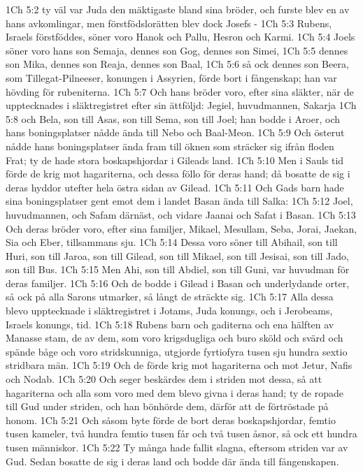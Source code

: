 1Ch 5:2  ty väl var Juda den mäktigaste bland sina bröder, och furste blev en av hans avkomlingar, men förstfödslorätten blev dock Josefs -
1Ch 5:3  Rubens, Israels förstföddes, söner voro Hanok och Pallu, Hesron och Karmi.
1Ch 5:4  Joels söner voro hans son Semaja, dennes son Gog, dennes son Simei,
1Ch 5:5  dennes son Mika, dennes son Reaja, dennes son Baal,
1Ch 5:6  så ock dennes son Beera, som Tillegat-Pilneeser, konungen i Assyrien, förde bort i fångenskap; han var hövding för rubeniterna.
1Ch 5:7  Och hans bröder voro, efter sina släkter, när de upptecknades i släktregistret efter sin ättföljd: Jegiel, huvudmannen, Sakarja
1Ch 5:8  och Bela, son till Asas, son till Sema, son till Joel; han bodde i Aroer, och hans boningsplatser nådde ända till Nebo och Baal-Meon.
1Ch 5:9  Och österut nådde hans boningsplatser ända fram till öknen som sträcker sig ifrån floden Frat; ty de hade stora boskapshjordar i Gileads land.
1Ch 5:10  Men i Sauls tid förde de krig mot hagariterna, och dessa föllo för deras hand; då bosatte de sig i deras hyddor utefter hela östra sidan av Gilead.
1Ch 5:11  Och Gads barn hade sina boningsplatser gent emot dem i landet Basan ända till Salka:
1Ch 5:12  Joel, huvudmannen, och Safam därnäst, och vidare Jaanai och Safat i Basan.
1Ch 5:13  Och deras bröder voro, efter sina familjer, Mikael, Mesullam, Seba, Jorai, Jaekan, Sia och Eber, tillsammans sju.
1Ch 5:14  Dessa voro söner till Abihail, son till Huri, son till Jaroa, son till Gilead, son till Mikael, son till Jesisai, son till Jado, son till Bus.
1Ch 5:15  Men Ahi, son till Abdiel, son till Guni, var huvudman för deras familjer.
1Ch 5:16  Och de bodde i Gilead i Basan och underlydande orter, så ock på alla Sarons utmarker, så långt de sträckte sig.
1Ch 5:17  Alla dessa blevo upptecknade i släktregistret i Jotams, Juda konungs, och i Jerobeams, Israels konungs, tid.
1Ch 5:18  Rubens barn och gaditerna och ena hälften av Manasse stam, de av dem, som voro krigsdugliga och buro sköld och svärd och spände båge och voro stridskunniga, utgjorde fyrtiofyra tusen sju hundra sextio stridbara män.
1Ch 5:19  Och de förde krig mot hagariterna och mot Jetur, Nafis och Nodab.
1Ch 5:20  Och seger beskärdes dem i striden mot dessa, så att hagariterna och alla som voro med dem blevo givna i deras hand; ty de ropade till Gud under striden, och han bönhörde dem, därför att de förtröstade på honom.
1Ch 5:21  Och såsom byte förde de bort deras boskapshjordar, femtio tusen kameler, två hundra femtio tusen får och två tusen åsnor, så ock ett hundra tusen människor.
1Ch 5:22  Ty många hade fallit slagna, eftersom striden var av Gud. Sedan bosatte de sig i deras land och bodde där ända till fångenskapen.
